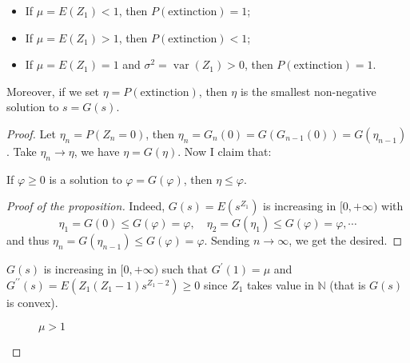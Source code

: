 \documentclass[11pt,singlecolumn, openany, citestyle=authoryear]{elegantbook}
\begin{document}
\begin{CJK}{UTF8}{gbsn}
\begin{theorem}
    \begin{itemize}
        \item If $\mu=E(Z_1)<1$, then $P(\text{extinction})=1$;
        \item If $\mu=E(Z_1)>1$, then $P(\text{extinction})<1$;
        \item If $\mu=E(Z_1)=1$ and $\sigma^2=\operatorname{var}(Z_1)>0$,
        then $P(\text{extinction})=1$.
    \end{itemize}
    Moreover, if we set $\eta=P(\text{extinction})$, then $\eta$ is the smallest 
    non-negative solution to $s = G(s)$.
\end{theorem}
\begin{proof}
    Let $\eta_n=P(Z_n=0)$, then $\eta_n=G_n(0)=G(G_{n-1}(0))=
    G(\eta_{n-1})$. Take $\eta_n \to \eta$, we have 
    $\eta = G(\eta)$. Now I claim that:
    \begin{proposition}
    If $\varphi\geqslant0$ is a solution to 
    $\varphi = G(\varphi)$, then $\eta \leqslant \varphi$.
    \end{proposition}
    \begin{proof}[Proof of the proposition]
        Indeed, $G(s)=E(s^{Z_1})$ is increasing in $[0,+\infty)$ with 
        $$
        \eta_1 = G(0)\leqslant G(\varphi) = \varphi,\quad
        \eta_2 =G(\eta_1)\leqslant G(\varphi) = \varphi,
        \cdots
        $$
        and thus $\eta_n=G(\eta_{n-1})\leqslant G(\varphi)=\varphi$. Sending $n\to\infty$,
        we get the desired.
    \end{proof}
    $G(s)$ is increasing in $[0,+\infty)$ such that $G^\prime(1)=\mu$ and 
    $G^{\prime\prime}(s)=E(Z_1(Z_1-1)s^{Z_1-2})\geqslant 0$ since $Z_1$ takes value in 
    $\mathbb{N}$ (that is $G(s)$ is convex).
    \begin{figure}[htbp]
        \centering 
        \caption{$\mu>1$}
        \label{figure:fig1}
    \end{figure}


\end{proof}
\end{CJK}
\end{document}
